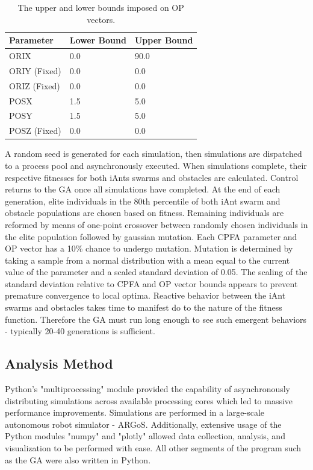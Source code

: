 \documentclass{acm_proc_article-sp}
\begin{document}
\begin{table}[h]
\begin{tabular}{@{}lll@{}}
\toprule
Parameter    & Lower Bound & Upper Bound \\ \midrule
ORIX         & 0.0         & 90.0        \\
ORIY (Fixed) & 0.0         & 0.0         \\
ORIZ (Fixed) & 0.0         & 0.0         \\
POSX         & 1.5         & 5.0         \\
POSY         & 1.5         & 5.0         \\
POSZ (Fixed) & 0.0         & 0.0         \\ \bottomrule
\end{tabular}
\caption{The upper and lower bounds imposed on OP vectors.} \label{table:opBounds}
\end{table}

A random seed is generated for each simulation, then simulations are dispatched to a process pool and asynchronously executed. When simulations complete, their respective fitnesses for both iAnts swarms and obstacles are calculated. Control returns to the GA once all simulations have completed. At the end of each generation, elite individuals in the 80th percentile of both iAnt swarm and obstacle populations are chosen based on fitness. Remaining individuals are reformed by means of one-point crossover between randomly chosen individuals in the elite population followed by gaussian mutation. Each CPFA parameter and OP vector has a 10\% chance to undergo mutation. Mutation is determined by taking a sample from a normal distribution with a mean equal to the current value of the parameter and a scaled standard deviation of 0.05. The scaling of the standard deviation relative to CPFA and OP vector bounds appears to prevent premature convergence to local optima. Reactive behavior between the iAnt swarms and obstacles takes time to manifest do to the nature of the fitness function. Therefore the GA must run long enough to see such emergent behaviors - typically 20-40 generations is sufficient.

\subsection{Analysis Method}

Python's "multiprocessing" module provided the capability of asynchronously distributing simulations across available processing cores which led to massive performance improvements. Simulations are performed in a large-scale autonomous robot simulator - ARGoS. Additionally, extensive usage of the Python modules "numpy" and "plotly" allowed data collection, analysis, and visualization to be performed with ease. All other segments of the program such as the GA were also written in Python.
\end{document}
